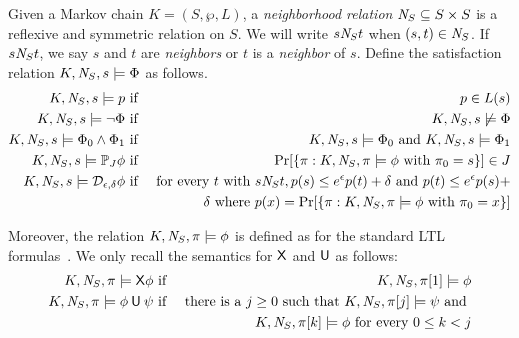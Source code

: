 
Given a Markov chain $K = (S, \wp, L)$, a
\emph{neighborhood relation} $\mathit{N}_{S} \subseteq S \times S$
is a reflexive and symmetric relation on $S$. We will write $s
\mathit{N}_{S} t$ when $(s, t) \in \mathit{N}_{S}$. If $s \mathit{N}_{S} t$,
we say $s$ and $t$ are \emph{neighbors} or $t$ is a \emph{neighbor} of
$s$. Define the satisfaction relation $K, \mathit{N}_{S}, s
\models \Phi$ as follows.
\begin{eqnarray*}
  K, \mathit{N}_{S}, s \models p
  & \textmd{ if } &
  p \in L(s)\\
  K, \mathit{N}_{S}, s \models \neg \Phi
  & \textmd{ if } &
  K, \mathit{N}_{S}, s \not\models \Phi\\
  K, \mathit{N}_{S}, s \models \Phi_0 \wedge \Phi_1
  & \textmd{ if } &
  K, \mathit{N}_{S}, s \models \Phi_0 \textmd{ and }
  K, \mathit{N}_{S}, s \models \Phi_1\\
  K, \mathit{N}_{S}, s \models \mathbb{P}_{J} \phi
  & \textmd{ if } &
  \Pr [\{ \pi : K, \mathit{N}_{S}, \pi \models \phi \textmd{ with }
                    \pi_0 = s\}] \in J \\
  K, \mathit{N}_{S}, s \models \mathcal{D}_{{\epsilon}, {\delta}} \phi
  & \textmd{ if } &
  \textmd{for every } t \textmd{ with }  s \mathit{N}_{S} t,
      p(s) \leq e^{\epsilon} p(t) + \delta \textmd{ and }
      p(t) \leq e^{\epsilon} p(s)  +  \\
  & &  \delta \textmd{ where } p(x) = \Pr [\{
      \pi : K, \mathit{N}_{S}, \pi \models \phi \textmd{ with }
      \pi_0 = x \}]
\end{eqnarray*}

Moreover, the relation $K, \mathit{N}_{S}, \pi \models \phi$ is defined as
for the standard LTL formulas~\cite{ManneP92}. We only recall the semantics for $\mathsf{X}$ and $\mathbin{\mathsf{U}}$ as follows:
\begin{eqnarray*}
  K, \neighbor{S}, \pi \models \X \phi
  & \textmd{ if } &
  K, \neighbor{S}, \pi[1] \models \phi\\
  K, \neighbor{S}, \pi \models \phi \until \psi
  & \textmd{ if } &
  \textmd{there is a } j \geq 0 \textmd{ such that }
  K, \neighbor{S}, \pi[j] \models \psi \textmd{ and } \\
  & & K, \neighbor{S}, \pi[k] \models \phi
      \textmd{ for every } 0 \leq k < j
\hide{
  K, \neighbor{S}, \pi \models \Phi \buntil{n} \Psi
  & \textmd{ if } &
  \textmd{there is a } 0 \leq j \leq n \textmd{ such that }
  K, \neighbor{S}, \pi[j] \models \Psi \textmd{ and } \\
  & & K, \neighbor{S}, \pi[k] \models \Phi
      \textmd{ for every } 0 \leq k < j
}
\end{eqnarray*}

